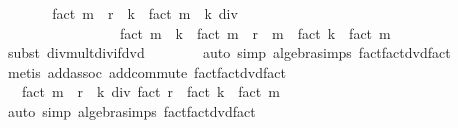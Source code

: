 \begin{isabellebody}
\ \ \isamarkupfalse%
\ \isamarkupfalse%
\ {\isachardoublequoteopen}{\isachardot}{\kern0pt}{\isachardot}{\kern0pt}{\isachardot}{\kern0pt}\ {\isacharequal}{\kern0pt}\ fact\ {\isacharparenleft}{\kern0pt}m\ {\isacharplus}{\kern0pt}\ r\ {\isacharplus}{\kern0pt}\ k{\isacharparenright}{\kern0pt}\ {\isacharasterisk}{\kern0pt}\ fact\ {\isacharparenleft}{\kern0pt}m\ {\isacharplus}{\kern0pt}\ k{\isacharparenright}{\kern0pt}\ div\isanewline
\ \ \ \ \ \ \ \ \ \ \ \ \ \ \ \ \ {\isacharparenleft}{\kern0pt}fact\ {\isacharparenleft}{\kern0pt}m\ {\isacharplus}{\kern0pt}\ k{\isacharparenright}{\kern0pt}\ {\isacharasterisk}{\kern0pt}\ fact\ {\isacharparenleft}{\kern0pt}m\ {\isacharplus}{\kern0pt}\ r\ {\isacharminus}{\kern0pt}\ m{\isacharparenright}{\kern0pt}\ {\isacharasterisk}{\kern0pt}\ {\isacharparenleft}{\kern0pt}fact\ k\ {\isacharasterisk}{\kern0pt}\ fact\ m{\isacharparenright}{\kern0pt}{\isacharparenright}{\kern0pt}{\isachardoublequoteclose}\isanewline
\ \ \ \ \isamarkupfalse%
\ {\isacharparenleft}{\kern0pt}subst\ div{\isacharunderscore}{\kern0pt}mult{\isacharunderscore}{\kern0pt}div{\isacharunderscore}{\kern0pt}if{\isacharunderscore}{\kern0pt}dvd{\isacharparenright}{\kern0pt}\isanewline
\ \ \ \ \ \ \isamarkupfalse%
\ {\isacharparenleft}{\kern0pt}auto\ simp{\isacharcolon}{\kern0pt}\ algebra{\isacharunderscore}{\kern0pt}simps\ fact{\isacharunderscore}{\kern0pt}fact{\isacharunderscore}{\kern0pt}dvd{\isacharunderscore}{\kern0pt}fact{\isacharparenright}{\kern0pt}\isanewline
\ \ \ \ \isamarkupfalse%
\ {\isacharparenleft}{\kern0pt}metis\ add{\isachardot}{\kern0pt}assoc\ add{\isachardot}{\kern0pt}commute\ fact{\isacharunderscore}{\kern0pt}fact{\isacharunderscore}{\kern0pt}dvd{\isacharunderscore}{\kern0pt}fact{\isacharparenright}{\kern0pt}\isanewline
\ \ \ \ \isamarkupfalse%
\isanewline
\ \ \isamarkupfalse%
\ \isamarkupfalse%
\ {\isachardoublequoteopen}{\isasymdots}\ {\isacharequal}{\kern0pt}\ fact\ {\isacharparenleft}{\kern0pt}m\ {\isacharplus}{\kern0pt}\ r\ {\isacharplus}{\kern0pt}\ k{\isacharparenright}{\kern0pt}\ div\ {\isacharparenleft}{\kern0pt}fact\ r\ {\isacharasterisk}{\kern0pt}\ {\isacharparenleft}{\kern0pt}fact\ k\ {\isacharasterisk}{\kern0pt}\ fact\ m{\isacharparenright}{\kern0pt}{\isacharparenright}{\kern0pt}{\isachardoublequoteclose}\isanewline
\ \ \ \ \isamarkupfalse%
\ {\isacharparenleft}{\kern0pt}auto\ simp{\isacharcolon}{\kern0pt}\ algebra{\isacharunderscore}{\kern0pt}simps\ fact{\isacharunderscore}{\kern0pt}fact{\isacharunderscore}{\kern0pt}dvd{\isacharunderscore}{\kern0pt}fact{\isacharparenright}{\kern0pt}\isanewline

\end{isabellebody}

